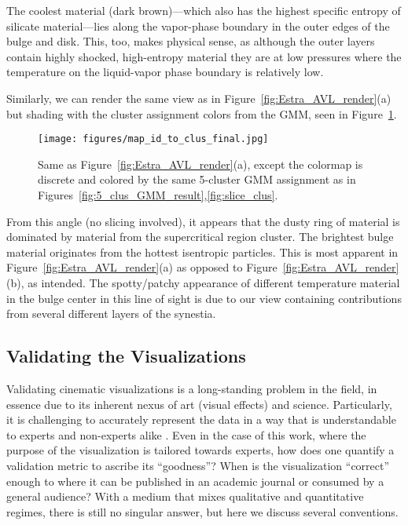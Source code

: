 \documentclass[fleqn,usenatbib,useAMS]{mnras}
\begin{document}
The coolest material (dark brown)---which also has the highest specific entropy of silicate material---lies along the vapor-phase boundary in the outer edges of the bulge and disk. This, too, makes physical sense, as although the outer layers contain highly shocked, high-entropy material they are at low pressures where the temperature on the liquid-vapor phase boundary is relatively low. \par

Similarly, we can render the same view as in Figure~\ref{fig:Estra_AVL_render}(a) but shading with the cluster assignment colors from the GMM, seen in Figure~\ref{fig:map_id_clus_final}.
%
\begin{figure}
\centering
\texttt{[image: figures/map\_id\_to\_clus\_final.jpg]}
\caption{Same as Figure~\ref{fig:Estra_AVL_render}(a), except the colormap is discrete and colored by the same 5-cluster GMM assignment as in Figures~\ref{fig:5_clus_GMM_result},\ref{fig:slice_clus}.}
\label{fig:map_id_clus_final}
\end{figure}
%
From this angle (no slicing involved), it appears that the dusty ring of material is dominated by material from the supercritical region cluster. The brightest bulge material originates from the hottest isentropic particles. This is most apparent in Figure~\ref{fig:Estra_AVL_render}(a) as opposed to Figure~\ref{fig:Estra_AVL_render}(b), as intended. The spotty/patchy appearance of different temperature material in the bulge center in this line of sight is due to our view containing contributions from several different layers of the synestia. \par




\subsection{Validating the Visualizations}\label{subsec:validation}

Validating cinematic visualizations is a long-standing problem in the field, in essence due to its inherent nexus of art (visual effects) and science. Particularly, it is challenging to accurately represent the data in a way that is understandable to experts and non-experts alike \citep{Borkiewicz17}. Even in the case of this work, where the purpose of the visualization is tailored towards experts, how does one quantify a validation metric to ascribe its ``goodness''? When is the visualization ``correct'' enough to where it can be published in an academic journal or consumed by a general audience? With a medium that mixes qualitative and quantitative regimes, there is still no singular answer, but here we discuss several conventions. \par
\end{document}
